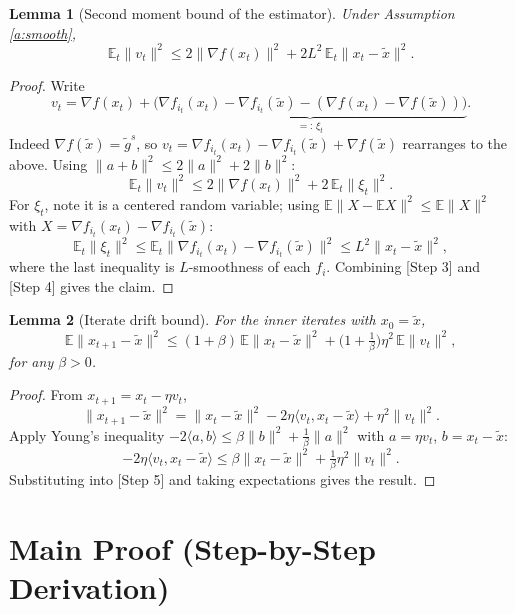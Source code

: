 \documentclass[11pt]{article}
\newtheorem{lemma}{Lemma}
\begin{document}
\begin{lemma}[Second moment bound of the estimator]\label{lem:var}
Under Assumption \ref{a:smooth},
\[
\mathbb{E}_t\|v_t\|^2 \le 2\|\nabla f(x_t)\|^2 + 2L^2\,\mathbb{E}_t\|x_t - \tilde{x}\|^2.
\]
\end{lemma}
\begin{proof}
Write
\[
v_t = \nabla f(x_t) + \underbrace{\big(\nabla f_{i_t}(x_t) - \nabla f_{i_t}(\tilde{x}) - (\nabla f(x_t)-\nabla f(\tilde{x}))\big)}_{=:\,\xi_t}.
\tag*{[Step 2]}
\]
Indeed $\nabla f(\tilde{x})=\tilde{g}^s$, so $v_t = \nabla f_{i_t}(x_t)-\nabla f_{i_t}(\tilde{x})+\nabla f(\tilde x)$ rearranges to the above.
Using $\|a+b\|^2 \le 2\|a\|^2+2\|b\|^2$:
\[
\mathbb{E}_t\|v_t\|^2 \le 2\|\nabla f(x_t)\|^2 + 2\,\mathbb{E}_t\|\xi_t\|^2.
\tag*{[Step 3]}
\]
For $\xi_t$, note it is a centered random variable; using
$\mathbb{E}\|X-\mathbb{E}X\|^2\le \mathbb{E}\|X\|^2$ with
$X=\nabla f_{i_t}(x_t)-\nabla f_{i_t}(\tilde{x})$:
\[
\mathbb{E}_t\|\xi_t\|^2 \le \mathbb{E}_t\|\nabla f_{i_t}(x_t) - \nabla f_{i_t}(\tilde{x})\|^2
\le L^2 \|x_t - \tilde{x}\|^2,
\tag*{[Step 4]}
\]
where the last inequality is $L$-smoothness of each $f_i$. Combining
[Step 3] and [Step 4] gives the claim.
\end{proof}

\begin{lemma}[Iterate drift bound]\label{lem:drift}
For the inner iterates with $x_0=\tilde{x}$,
\[
\mathbb{E}\|x_{t+1}-\tilde{x}\|^2 \le (1+\beta)\,\mathbb{E}\|x_t-\tilde{x}\|^2
+ \Big(1+\tfrac{1}{\beta}\Big)\eta^2\,\mathbb{E}\|v_t\|^2,
\]
for any $\beta>0$.
\end{lemma}
\begin{proof}
From $x_{t+1}=x_t-\eta v_t$,
\[
\|x_{t+1}-\tilde{x}\|^2 = \|x_t-\tilde{x}\|^2 - 2\eta\langle v_t, x_t-\tilde{x}\rangle + \eta^2\|v_t\|^2.
\tag*{[Step 5]}
\]
Apply Young's inequality $-2\langle a,b\rangle \le \beta\|b\|^2 + \tfrac{1}{\beta}\|a\|^2$
with $a=\eta v_t$, $b = x_t-\tilde x$:
\[
-2\eta\langle v_t,x_t-\tilde{x}\rangle \le \beta\|x_t-\tilde{x}\|^2 + \tfrac{1}{\beta}\eta^2\|v_t\|^2.
\tag*{[Step 6]}
\]
Substituting into [Step 5] and taking expectations gives the result.
\end{proof}

\section*{Main Proof (Step-by-Step Derivation)}
\end{document}
